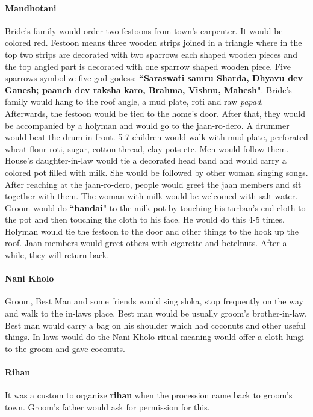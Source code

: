 \paragraph{Mandhotani} Bride's family would order two festoons from town's
carpenter. It would be colored red. Festoon means three wooden strips joined in
a triangle where in the top two strips are decorated with two sparrows each
shaped wooden pieces and the top angled part is decorated with one sparrow
shaped wooden piece. Five sparrows symbolize five god-godess:
\textbf{``Saraswati samru Sharda, Dhyavu dev Ganesh; paanch dev raksha karo,
Brahma, Vishnu, Mahesh"}. Bride's family would hang to the roof angle, a mud
plate, roti and raw \textit{papad}. Afterwards, the festoon would be tied to
the home's door. After that, they would be accompanied by a holyman and would
go to the jaan-ro-dero. A drummer would beat the drum in front. 5-7 children
would walk with mud plate, perforated wheat flour roti, sugar, cotton thread,
clay pots etc. Men would follow them. House's daughter-in-law would tie a
decorated head band and would carry a colored pot filled with milk. She would
be followed by other woman singing songs. After reaching at the jaan-ro-dero,
people would greet the jaan members and sit together with them. The woman with
milk would be welcomed with salt-water. Groom would do \textbf{``bandai"} to the
milk pot by touching his turban's end cloth to the pot and then touching the
cloth to his face. He would do this 4-5 times. Holyman would tie the festoon to
the door and other things to the hook up the roof. Jaan members would greet
others with cigarette and betelnuts. After a while, they will return back.

\paragraph{Nani Kholo} Groom, Best Man and some friends would sing sloka, stop
frequently on the way and walk to the in-laws place. Best man would be usually
groom's brother-in-law. Best man would carry a bag on his shoulder which had
coconuts and other useful things. In-laws would do the Nani Kholo ritual
meaning would offer a cloth-lungi to the groom and gave coconuts.

\paragraph{Rihan} It was a custom to organize \textbf{rihan} when the
procession came back to groom's town. Groom's father would ask for permission
for this.

